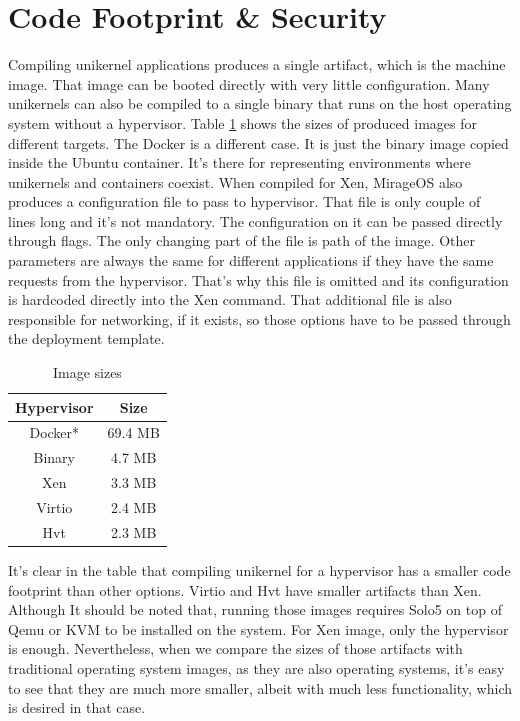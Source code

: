 \section{Code Footprint \& Security}
Compiling unikernel applications produces a single artifact, which is the machine image. That image can be booted directly with very little configuration. Many unikernels can also be compiled to a single binary that runs on the host operating system without a hypervisor. Table \ref{tab:sizes} shows the sizes of produced images for different targets. The Docker is a different case. It is just the binary image copied inside the Ubuntu container. It's there for representing environments where unikernels and containers coexist. When compiled for Xen, MirageOS also produces a configuration file to pass to hypervisor. That file is only couple of lines long and it's not mandatory. The configuration on it can be passed directly through flags. The only changing part of the file is path of the image. Other parameters are always the same for different applications if they have the same requests from the hypervisor. That's why this file is omitted and its configuration is hardcoded directly into the Xen command. That additional file is also responsible for networking, if it exists, so those options have to be passed through the deployment template.


\begin{table}[htpb]
  
  \centering
  \begin{tabular}{ |c|c| }
    \toprule
      Hypervisor & Size \\
    \midrule
    Docker* & 69.4 MB \\
     
      \hline
      Binary & 4.7 MB \\
    \hline
    Xen &  3.3 MB\\
    \hline
    Virtio & 2.4 MB \\
    \hline
      Hvt & 2.3 MB\\
    \bottomrule
  \end{tabular}
  \caption[Image Sizes]{Image sizes}\label{tab:sizes}
\end{table}


It's clear in the table that compiling unikernel for a hypervisor has a smaller code footprint than other options. Virtio and Hvt have smaller artifacts than Xen. Although It should be noted that, running those images requires Solo5 on top of Qemu or KVM to be installed on the system. For Xen image, only the hypervisor is enough. Nevertheless, when we compare the sizes of those artifacts with traditional operating system images, as they are also operating systems, it's easy to see that they are much more smaller, albeit with much less functionality, which is desired in that case.

